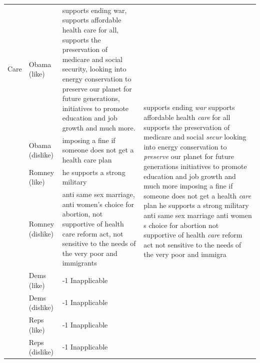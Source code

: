\documentclass[12pt]{article}
\begin{document}
\begin{footnotesize}
\begin{center}
\begin{longtable}{lp{1.5cm}p{5.5cm}p{5.5cm}}
	Care & Obama (like) & supports ending war, supports affordable health care for all, supports the preservation of medicare and social security, looking into energy conservation to preserve our planet for future generations, initiatives to promote education and job growth and much more. & \multirow{8}{5.5cm}{supports ending \textit{war} supports affordable health \textit{care} for all supports the preservation of medicare and social \textit{secur} looking into energy conservation to \textit{preserve} our planet for future generations initiatives to promote education and job growth and much more imposing a fine if someone does not get a health \textit{care} plan he supports a strong military anti same sex marriage anti women s choice for abortion not supportive of health \textit{care} reform act not sensitive to the needs of the very poor and immigra} \\
		 & Obama (dislike) & imposing a fine if someone does not get a health care plan \\
		 & Romney (like) & he supports a strong military \\
		 & Romney (dislike) & anti same sex marriage, anti women's choice for abortion, not supportive of health care reform act, not sensitive to the needs of the very poor and immigrants \\
		 & Dems (like) & -1 Inapplicable \\
		 & Dems (dislike) & -1 Inapplicable \\
		 & Reps (like) & -1 Inapplicable \\
		 & Reps (dislike) & -1 Inapplicable \\ \hline
	

\end{longtable}
\end{center}
\end{footnotesize}
\end{document}

